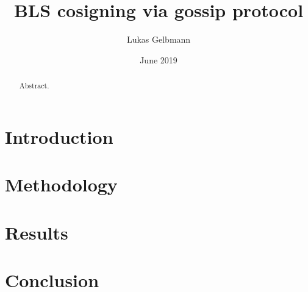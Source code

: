 \documentclass{article}
\title{BLS cosigning via gossip protocol}
\author{Lukas Gelbmann}
\date{June 2019}
\begin{document}
\maketitle


\begin{abstract}

Abstract.

\end{abstract}


\tableofcontents


\section{Introduction}


\section{Methodology}


\section{Results}


\section{Conclusion}




\end{document}
